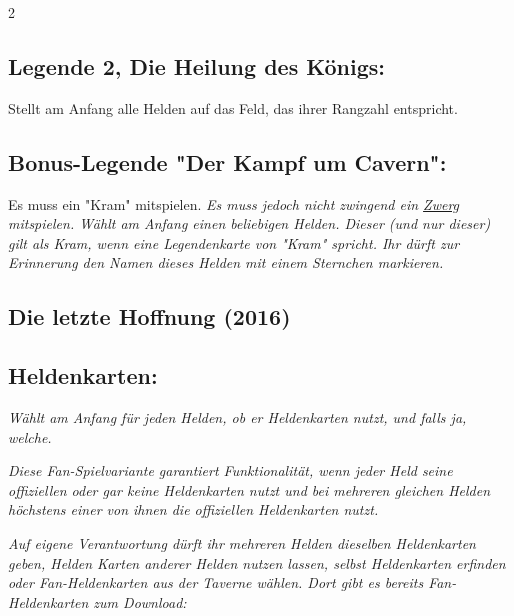 \documentclass[10pt, a4paper, oneside]{book}
\newcommand{\fan}[1]{\textit{#1}}
\begin{document}
\begin{multicols*}{2}
\begin{bgcolor}
\subsection{Legende 2, Die Heilung des Königs:}

Stellt am Anfang alle Helden auf das Feld, das ihrer Rangzahl entspricht.
\supercite{DLvA2:A,NH:Begleitheft,DH:Begleitheft,MH:Begleitheft}



\subsection{Bonus-Legende "Der Kampf um Cavern":}

Es muss ein "Kram" mitspielen.
\supercite{BL_KuC:A}
\fan{Es muss jedoch nicht zwingend ein \hyperref[Zwerg]{Zwerg} mitspielen. Wählt am Anfang einen beliebigen Helden. Dieser (und nur dieser) gilt als Kram, wenn eine Legendenkarte von "Kram" spricht. Ihr dürft zur Erinnerung den Namen dieses Helden mit einem Sternchen markieren.}

\end{bgcolor}








\begin{bgcolor}
\section{Die letzte Hoffnung (2016)}





\subsection{Heldenkarten:}

\fan{Wählt am Anfang für jeden Helden, ob er Heldenkarten nutzt, und falls ja, welche.}

\fan{Diese Fan-Spielvariante garantiert Funktionalität, wenn jeder Held seine offiziellen oder gar keine Heldenkarten nutzt und bei mehreren gleichen Helden höchstens einer von ihnen die offiziellen Heldenkarten nutzt.}

\fan{Auf eigene Verantwortung dürft ihr mehreren Helden dieselben Heldenkarten geben, Helden Karten anderer Helden nutzen lassen, selbst Heldenkarten erfinden oder Fan-Heldenkarten aus der Taverne wählen. Dort gibt es bereits Fan-Heldenkarten zum Download:}


\end{bgcolor}
\end{multicols*}
\end{document}
